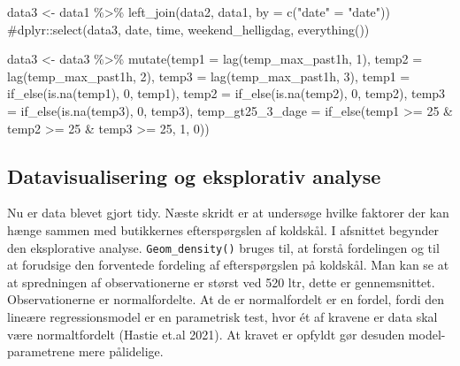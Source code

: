 \documentclass[
  12pt,
  a4paper,
  DIV=11,
  numbers=noendperiod]{scrartcl}
\newenvironment{Shaded}{\begin{snugshade}}{\end{snugshade}}
\newcommand{\AttributeTok}[1]{\textcolor[rgb]{0.40,0.45,0.13}{#1}}
\newcommand{\CommentTok}[1]{\textcolor[rgb]{0.37,0.37,0.37}{#1}}
\newcommand{\DecValTok}[1]{\textcolor[rgb]{0.68,0.00,0.00}{#1}}
\newcommand{\FunctionTok}[1]{\textcolor[rgb]{0.28,0.35,0.67}{#1}}
\newcommand{\NormalTok}[1]{\textcolor[rgb]{0.00,0.23,0.31}{#1}}
\newcommand{\OtherTok}[1]{\textcolor[rgb]{0.00,0.23,0.31}{#1}}
\newcommand{\SpecialCharTok}[1]{\textcolor[rgb]{0.37,0.37,0.37}{#1}}
\newcommand{\StringTok}[1]{\textcolor[rgb]{0.13,0.47,0.30}{#1}}
\begin{document}
\begin{Shaded}
\begin{Highlighting}[numbers=left,,]
\NormalTok{data3 }\OtherTok{\textless{}{-}}\NormalTok{ data1 }\SpecialCharTok{\%\textgreater{}\%}
\FunctionTok{left\_join}\NormalTok{(data2, data1, }\AttributeTok{by =} \FunctionTok{c}\NormalTok{(}\StringTok{"date"} \OtherTok{=} \StringTok{"date"}\NormalTok{))}
\CommentTok{\#dplyr::select(data3, date, time, weekend\_helligdag, everything())}


\NormalTok{data3 }\OtherTok{\textless{}{-}}\NormalTok{ data3 }\SpecialCharTok{\%\textgreater{}\%} 
  \FunctionTok{mutate}\NormalTok{(}\AttributeTok{temp1 =} \FunctionTok{lag}\NormalTok{(temp\_max\_past1h, }\DecValTok{1}\NormalTok{), }
         \AttributeTok{temp2 =} \FunctionTok{lag}\NormalTok{(temp\_max\_past1h, }\DecValTok{2}\NormalTok{),}
         \AttributeTok{temp3 =} \FunctionTok{lag}\NormalTok{(temp\_max\_past1h, }\DecValTok{3}\NormalTok{),}
         \AttributeTok{temp1 =} \FunctionTok{if\_else}\NormalTok{(}\FunctionTok{is.na}\NormalTok{(temp1), }\DecValTok{0}\NormalTok{, temp1),}
         \AttributeTok{temp2 =} \FunctionTok{if\_else}\NormalTok{(}\FunctionTok{is.na}\NormalTok{(temp2), }\DecValTok{0}\NormalTok{, temp2),}
         \AttributeTok{temp3 =} \FunctionTok{if\_else}\NormalTok{(}\FunctionTok{is.na}\NormalTok{(temp3), }\DecValTok{0}\NormalTok{, temp3),}
         \AttributeTok{temp\_gt25\_3\_dage =} \FunctionTok{if\_else}\NormalTok{(temp1 }\SpecialCharTok{\textgreater{}=} \DecValTok{25} \SpecialCharTok{\&}\NormalTok{ temp2 }\SpecialCharTok{\textgreater{}=} \DecValTok{25} \SpecialCharTok{\&}\NormalTok{ temp3 }\SpecialCharTok{\textgreater{}=} \DecValTok{25}\NormalTok{, }\DecValTok{1}\NormalTok{, }
                                    \DecValTok{0}\NormalTok{))}
\end{Highlighting}
\end{Shaded}

\hypertarget{datavisualisering-og-eksplorativ-analyse}{%
\subsection{Datavisualisering og eksplorativ
analyse}\label{datavisualisering-og-eksplorativ-analyse}}

Nu er data blevet gjort tidy. Næste skridt er at undersøge hvilke
faktorer der kan hænge sammen med butikkernes efterspørgslen af
koldskål. I afsnittet begynder den eksplorative analyse.
\texttt{Geom\_density()} bruges til, at forstå fordelingen og til at
forudsige den forventede fordeling af efterspørgslen på koldskål. Man
kan se at at spredningen af observationerne er størst ved 520 ltr, dette
er gennemsnittet. Observationerne er normalfordelte. At de er
normalfordelt er en fordel, fordi den lineære regressionsmodel er en
parametrisk test, hvor ét af kravene er data skal være normaltfordelt
(Hastie et.al 2021). At kravet er opfyldt gør desuden model-parametrene
mere pålidelige.
\end{document}
